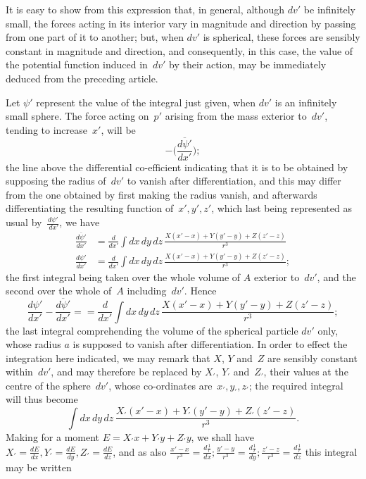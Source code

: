 \documentclass[12pt,notitlepage]{amsart}
\begin{document}
It is easy to show from this expression that, in general, although $dv'$
be infinitely small, the forces acting in its interior vary in magnitude and 
direction by passing from one part of it to another; but,
when $dv'$ is spherical,
these forces are sensibly constant in magnitude and direction, and consequently,
in this case, the value of the potential function
induced in~$dv'$ by their action,
may be immediately deduced from the preceding article.

Let $\psi'$ represent the value of the integral just given, when $dv'$ is an
infinitely small sphere. The force acting on~$p'$ arising from the mass exterior
to~$dv'$, tending to increase~$x'$, will be
\[
-\biggl(\frac{\overline{d\psi'}}{dx'}\biggl);
\]
the line above the differential co-efficient
indicating that it is to be obtained
by supposing the radius of~$dv'$ to vanish after differentiation,
and this may
differ from the one obtained by first making the radius vanish, and afterwards
differentiating the resulting function of~$x',y',z'$,
which last being represented
as usual by~$\frac{d\psi'}{~dx'}$, we have
\[
\begin{aligned}
\frac{\overline{d\psi'}}{dx'} &=
\frac{d}{dx'}\int dx\,dy\,dz\,\frac{X(x'-x)+Y(y'-y)+Z(z'-z)}{r^3}\\
\frac{{d\psi'}}{dx'} &=
\frac{d}{dx'}\int dx\,dy\,dz\,\frac{X(x'-x)+Y(y'-y)+Z(z'-z)}{r^3};
\end{aligned}
\]
the first integral being taken over the whole volume of $A$ exterior to~$dv'$,
and the second over the whole of~$A$ including~$dv'$. Hence
\[
\frac{{d\psi'}}{dx'}-\frac{\overline{d\psi'}}{dx'}=
=\frac{d}{dx'}\int dx\,dy\,dz\,\frac{X(x'-x)+Y(y'-y)+Z(z'-z)}{r^3};
\]
the last integral comprehending the volume of the spherical particle $dv'$ only,
whose radius $a$ is supposed to vanish after differentiation. In order to effect
the integration here indicated, we may remark that $X$, $Y$ and~$Z$ are sensibly
constant within~$dv'$, and may therefore be replaced by
$X_\prime$, $Y_\prime$ and~$Z_\prime$, their
values at the centre of the sphere~$dv'$, whose co-ordinates
are~$x_\prime,y_\prime,z_\prime$;
the required integral will thus become
\[
\int dx\,dy\,dz\,\frac{X_\prime(x'-x)+Y_\prime(y'-y)+Z_\prime(z'-z)}{r^3}.
\]
Making for a moment $E=X_\prime x+Y_\prime y+Z_\prime y$,
we shall have $X_\prime=\frac{dE}{dx},Y_\prime=\frac{dE}{dy},Z_\prime=\frac{dE}{dz}$,
and as also $\frac{x'-x}{r^3}=\frac{d\frac1r}{dx};
\frac{y'-y}{r^3}=\frac{d\frac1r}{dy};
\frac{z'-z}{r^3}=\frac{d\frac1r}{dz}$
this integral may be written
\end{document}
